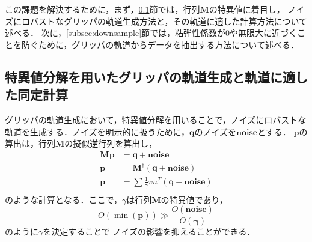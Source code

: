 \documentclass[a4paper]{jarticle}
\begin{document}
この課題を解決するために，まず，\ref{subsec:QR_traj_and_calculation}節では，行列$\mathbf{M}$の特異値に着目し，
ノイズにロバストなグリッパの軌道生成方法と，その軌道に適した計算方法について述べる．
次に，\ref{subsec:downsample}節では，粘弾性係数が0や無限大に近づくことを防ぐために，グリッパの軌道からデータを抽出する方法について述べる．
\subsection{特異値分解を用いたグリッパの軌道生成と軌道に適した同定計算}\label{subsec:QR_traj_and_calculation}
グリッパの軌道生成において，特異値分解を用いることで，ノイズにロバストな軌道を生成する．ノイズを明示的に扱うために，$\mathbf{q}$のノイズを$\mathbf{noise}$とする．
$\mathbf{p}$の算出は，行列$\mathbf{M}$の擬似逆行列を算出し，
\begin{equation}
    \begin{aligned}
    \mathbf{M}\mathbf{p} &= \mathbf{q} + \mathbf{noise}\\
              \mathbf{p} &= \mathbf{M}^{\dagger}(\mathbf{q} + \mathbf{noise})\\ 
              \mathbf{p} &= \sum \frac{1}{\gamma}vu^T(\mathbf{q}+\mathbf{noise})\\
    \end{aligned}     
\end{equation}
のような計算となる．ここで，$\gamma$は行列$\mathbf{M}$の特異値であり，
\begin{equation}
    O(\min({\mathbf{p}})) \gg \frac{O(\mathbf{noise})}{O(\mathbf{\gamma})}
    \label{eq:gamma}
\end{equation}
のように$\gamma$を決定することで
ノイズの影響を抑えることができる．
\end{document}

